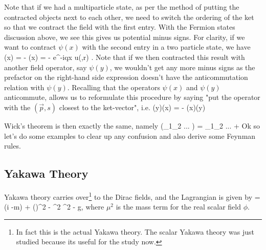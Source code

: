 \br 
\label{rem:FermionContractionsMultiparticleStates}
    Note that if we had a multiparticle state, as per the method of putting the contracted objects next to each other, we need to switch the ordering of the ket so that we contract the field with the first entry. With the Fermion states discussion above, we see this gives us potential minus signs. For clarity, if we want to contract $\psi(x)$ with the second entry in a two particle state, we have 
    \bse 
         \psi(x) = -  \psi(x) = - e^{-iq\cdot x} u(,r) .
    \ese 
    Note that if we then contracted this result with another field operator, say $\psi(y)$, we wouldn't get any more minus signs as the prefactor on the right-hand side expression doesn't have the anticommutation relation with $\psi(y)$. Recalling that the operators $\psi(x)$ and $\psi(y)$ anticommute, allows us to reformulate this procedure by saying "put the operator with the $(\vec{p},s)$ closest to the ket-vector", i.e. 
    \bse 
          \psi(y)\psi(x)  = -   \psi(x)\psi(y) 
    \ese 
\er 

Wick's theorem is then exactly the same, namely
\bse 
    \cT(\psi_1\overline{\psi}_2 ... ) = \cl \psi_1\overline{\psi}_2 ... \cl + 
\ese 
Ok so let's do some examples to clear up any confusion and also derive some Feynman rules. 

\subsection{Yakawa Theory}

Yakawa theory carries over\footnote{In fact this is the actual Yakawa theory. The scalar Yakawa theory was just studied because its useful for the study now.} to the Dirac fields, and the Lagrangian is given by 
\bse 
    \cL = \overline{\psi}\big(i\slashed{\p} -m\big) \psi +  (\p\phi)^2 -  \mu^2 \phi^2 - g\overline{\psi}\psi\phi,
\ese
where $\mu^2$ is the mass term for the real scalar field $\phi$. 

